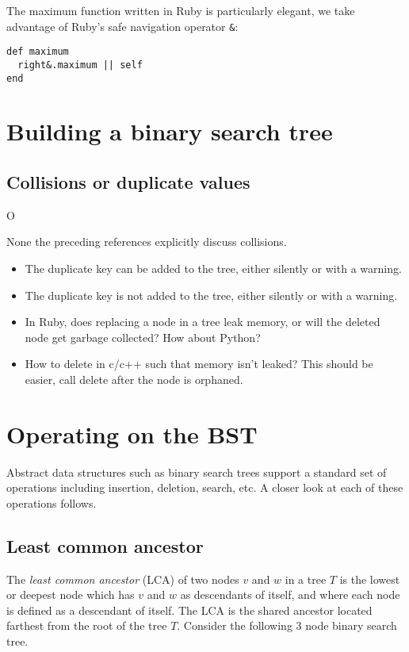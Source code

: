 \documentclass{article}
\begin{document}
\sno The maximum function written in Ruby is particularly elegant,
we take advantage of Ruby's safe navigation operator {\tt \&}:

\begin{lstlisting}[frame=none]
def maximum
  right&.maximum || self
end
\end{lstlisting}


\section{Building a binary search tree}

\subsection{Collisions or duplicate values}O


None the preceding references explicitly discuss collisions.

\begin{itemize}
\item The duplicate key can be added to the tree, either silently or with a warning.
\item The duplicate key is not added to the tree, either silently or with a warning.

\item In Ruby, does replacing a node in a tree leak memory, or will the deleted node
get garbage collected? How about Python?

\item How to delete in c/c++ such that memory isn't leaked? This should be easier,
call delete after the node is orphaned.
\end{itemize}


\section{Operating on the BST}

Abstract data structures such as binary search trees support a standard
set of operations including insertion, deletion, search, etc. A closer look
at each of these operations follows.

\subsection{Least common ancestor}

The \textit{least common ancestor} (LCA) of two nodes $v$ and $w$ in a tree $T$ is the
lowest or deepest node which has $v$ and $w$ as descendants of itself, and where
each node is defined as a descendant of itself. The LCA is the shared ancestor located
farthest from the root of the tree $T$. Consider the following 3 node binary search tree.
\end{document}
